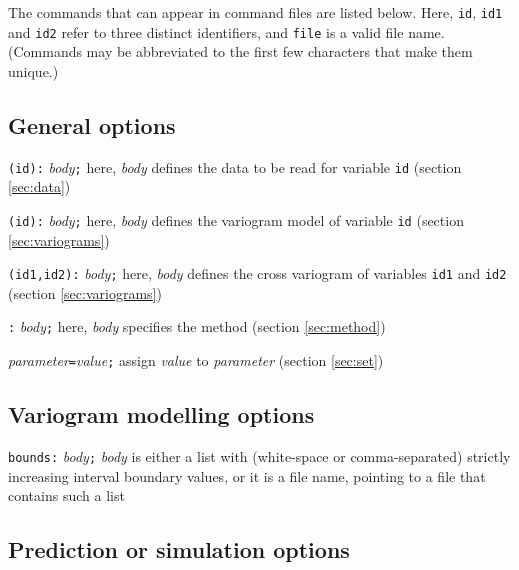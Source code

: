 \documentclass[a4paper,12pt]{book}
\makeatletter
\newcommand{\rmit}[1]{{\mdseries\itshape #1}}
\newcommand{\code}[1]{\texttt{#1}}
\newcommand{\iskey}[1]{\htmlref{\code{{#1}}}{key:#1}}
\newcommand{\thekey}[1]{\code{{#1}}\label{key:#1}\index{#1@\code{#1}}}
\newcommand{\Genop}{{\subsection{General options}}}
\newcommand{\Vgmop}{{\subsection{Variogram modelling options}}}
\newcommand{\Prop}{{\subsection{Prediction or simulation options}}}
\newenvironment{codelist}{%
\begin{description}\setlength{\labelsep}{0.5cm}}{%
\end{description}}
\makeatother
\begin{document}
The commands that can appear in command files are listed below. Here,
\code{id}, \code{id1} and \code{id2} refer to three distinct identifiers,
and {\tt file} is a valid file name. (Commands may be abbreviated to
the first few characters that make them unique.)

\Genop
\begin{codelist}
\item[\code{\iskey{data}(id):} \rmit{body}\code{;}]
here, {\em body} defines the data to be read for variable {\tt id}
(section \ref{sec:data})

\item[\code{\iskey{variogram}(id):} \rmit{body}\code{;}]
here, {\em body} defines the variogram model of variable {\tt id} (section
\ref{sec:variograms})

\item[\code{\iskey{variogram}(id1,id2):} \rmit{body}\code{;}]
here, {\em body} defines the cross variogram of variables {\tt id1}
and {\tt id2} (section \ref{sec:variograms})

\item[\code{\iskey{method}:} \rmit{body}\code{;}]
here, {\em body} specifies the method (section \ref{sec:method})

\item[\code{\iskey{set}} \rmit{parameter}\code{=}\rmit{value}\code{;}]
assign {\em value} to {\em parameter} (section \ref{sec:set})

\end{codelist}

\Vgmop

\begin{codelist}
\item[\code{\thekey{bounds}:} \rmit{body}\code{;}]
{\em body} is either a list with (white-space or comma-separated)
strictly increasing interval boundary values, or it is a file name,
pointing to a file that contains such a list

\end{codelist}

\Prop
\end{document}
